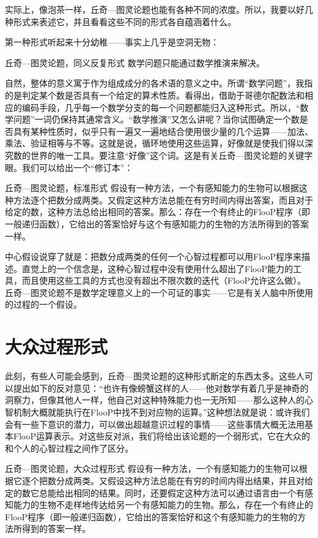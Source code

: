 实际上，像泡茶一样，丘奇—图灵论题也能有各种不同的浓度。所以，我要以好几种形式来表述它，并且看看这些不同的形式各自蕴涵着什么。

第一种形式听起来十分幼稚——事实上几乎是空洞无物：

\begin{thm}[2\ccwd]{丘奇—图灵论题，同义反复形式}
数学问题只能通过数学推演来解决。
\end{thm}

自然，整体的意义寓于作为组成成分的各术语的意义之中。所谓“数学问题”，我指的是判定某个数是否具有一个给定的算术性质。看得出，借助于哥德尔配数法和相应的编码手段，几乎每一个数学分支的每一个问题都能归入这种形式。所以，“数学问题”一词仍保持其通常含义。“数学推演”又怎么讲呢？当你试图确定一个数是否具有某种性质时，似乎只有一遍又一遍地结合使用很少量的几个运算——加法、乘法、验证相等与不等。这就是说，循环地使用这些运算，好像就是使我们得以深究数的世界的唯一工具。要注意“好像”这个词。这是有关丘奇—图灵论题的关键字眼。我们可以给出一个“修订本”：

\begin{thm}[2\ccwd]{丘奇—图灵论题，标准形式}
假设有一种方法，一个有感知能力的生物可以根据这种方法逐个把数分成两类。又假定这种方法总能在有穷时间内得出答案，而且对于给定的数，这种方法总给出相同的答案。那么：存在一个有终止的FlooP程序（即一般递归函数），它给出的答案恰好与这个有感知能力的生物的方法所得到的答案一样。
\end{thm}

中心假设说穿了就是：把数分成两类的任何一个心智过程都可以用FlooP程序来描述。直觉上的一个信念是，这种心智过程中没有使用什么超出了FlooP能力的工具，而且使用这些工具的方式也没有超出不限次数的迭代（FlooP允许这么做）。丘奇—图灵论题不是数学定理意义上的一个可证的事实——它是有关人脑中所使用的过程的一个假设。

\section{大众过程形式}

此刻，有些人可能会感到，丘奇—图灵论题的这种形式断定的东西太多。这些人可以提出如下的反对意见：“也许有像螃蟹这样的人——他对数学有着几乎是神奇的洞察力，但像其他人一样，他自己对这种特殊能力也一无所知——那么这种人的心智机制大概就能执行在FlooP中找不到对应物的运算。”这种想法就是说：或许我们会有一些下意识的潜力，可以做出超越意识过程的事情——这些事情大概无法用基本FlooP运算表示。对这些反对派，我们将给出该论题的一个弱形式，它在大众的和个人的心智过程之间作了区分。

\begin{thm}[2\ccwd]{丘奇—图灵论题，大众过程形式}
假设有一种方法，一个有感知能力的生物可以根据它逐个把数分成两类。又假设这种方法总能在有穷的时间内得出结果，并且对给定的数它总能给出相同的结果。同时，还要假定这种方法可以通过语言由一个有感知能力的生物不走样地传达给另一个有感知能力的生物。那么，存在一个有终止的FlooP程序（即一般递归函数），它给出的答案恰好和这个有感知能力的生物的方法所得到的答案一样。
\end{thm}

